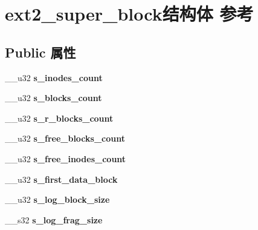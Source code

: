 \hypertarget{structext2__super__block}{}\section{ext2\+\_\+super\+\_\+block结构体 参考}
\label{structext2__super__block}
\subsection*{Public 属性}
\begin{DoxyCompactItemize}
\item 
\mbox{\label{structext2__super__block_a685b19762a18b8e0b116d54b10828ce9}} 
\+\_\+\+\_\+u32 {\bfseries s\+\_\+inodes\+\_\+count}
\item 
\mbox{\label{structext2__super__block_a050f144e31d47a647ac2be154a36bdc6}} 
\+\_\+\+\_\+u32 {\bfseries s\+\_\+blocks\+\_\+count}
\item 
\mbox{\label{structext2__super__block_aa725272544e04ccb88552e7d3f12ec44}} 
\+\_\+\+\_\+u32 {\bfseries s\+\_\+r\+\_\+blocks\+\_\+count}
\item 
\mbox{\label{structext2__super__block_ad5ec1bd13dd599e6e703bcaa9dc8f8d1}} 
\+\_\+\+\_\+u32 {\bfseries s\+\_\+free\+\_\+blocks\+\_\+count}
\item 
\mbox{\label{structext2__super__block_a5eccd8835d32ca652784ebf3d81cc573}} 
\+\_\+\+\_\+u32 {\bfseries s\+\_\+free\+\_\+inodes\+\_\+count}
\item 
\mbox{\label{structext2__super__block_a715dd8363b00214751f331559dbab2fd}} 
\+\_\+\+\_\+u32 {\bfseries s\+\_\+first\+\_\+data\+\_\+block}
\item 
\mbox{\label{structext2__super__block_a26cf02ec2fe3317f0055b771cffa426c}} 
\+\_\+\+\_\+u32 {\bfseries s\+\_\+log\+\_\+block\+\_\+size}
\item 
\mbox{\label{structext2__super__block_aaedcfd26784730461f5e0d9cda60290e}} 
\+\_\+\+\_\+s32 {\bfseries s\+\_\+log\+\_\+frag\+\_\+size}

\end{DoxyCompactItemize}
